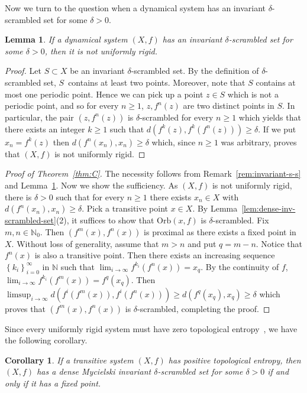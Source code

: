 \documentclass[reqno,a4paper,12pt]{amsart}
\newtheorem{lem}[thm]{Lemma}
\newtheorem{cor}[thm]{Corollary}
\theoremstyle{definition}
\numberwithin{equation}{section}
\begin{document}
Now we turn to the question when a dynamical system has an invariant $\delta$-scrambled set for some $\delta>0$.

\begin{lem}\label{lem:invariant-delta}
If a dynamical system $(X,f)$ has an invariant $\delta$-scrambled set for some $\delta>0$, then it is not uniformly rigid.
\end{lem}
\begin{proof}
Let $S\subset X$ be an invariant $\delta$-scrambled set. By the definition of $\delta$-scrambled set,
$S$~contains at least two points. Moreover, note that $S$ contains at most one periodic point. Hence we can pick up a point $z\in S$ which is not a periodic point,
and so for every $n\geq 1$, $z,f^n(z)$ are two distinct points in $S$. In particular, the pair
$(z,f^n(z))$ is $\delta$-scrambled for every $n\geq 1$ which yields that
there exists an integer $k\geq 1$ such that $d(f^k(z),f^k(f^n(z)))\geq \delta$.
If we put $x_n=f^k(z)$ then $d(f^n(x_n),x_n)\geq \delta$ which, since $n\geq 1$ was arbitrary, proves that $(X,f)$
is not uniformly rigid.
\end{proof}

\begin{proof}[Proof of Theorem~\ref{thm:C}]
The necessity follows from Remark~\ref{rem:invariant-s-s} and Lemma~\ref{lem:invariant-delta}.
Now we show the sufficiency.
As $(X,f)$ is not uniformly rigid, there is $\delta>0$ such that
for every $n\geq 1$ there exists $x_n\in X$ with $d(f^n(x_n),x_n)\geq \delta$.
Pick a transitive point $x\in X$. By Lemma~\ref{lem:dense-inv-scrambled-set}(2),
it suffices to show that ${\mbox{Orb}}(x,f)$ is $\delta$-scrambled.
Fix $m,n\in{\mathbb{N}}_0$. Then $(f^m(x),f^n(x))$ is proximal as there exists a fixed point in $X$.
Without loss of generality, assume that $m>n$ and put $q=m-n$.
Notice that $f^n(x)$ is also a transitive point. Then there exists an increasing sequence  ${\left\{{k_i}\right\}}_{i=0}^\infty$
in ${\mathbb{N}}$
such that $\lim_{i\to\infty}f^{k_i}(f^n(x))=x_q$.
By the continuity of $f$, $\lim_{i\to\infty}f^{k_i}(f^m(x))=f^q(x_q)$.
Then $\limsup_{i\to\infty} d(f^i(f^m(x)),f^i(f^n(x)))\geq d(f^q(x_q),x_q)\geq \delta$
which proves that $(f^m(x),f^n(x))$ is $\delta$-scrambled, completing the proof.
\end{proof}

Since every uniformly rigid system must have zero topological entropy~\cite{GM89},
we have the following corollary.

\begin{cor}
If a  transitive system $(X,f)$ has positive topological entropy, then
$(X,f)$ has a dense Mycielski invariant $\delta$-scrambled set for some $\delta>0$
if and only if it has a fixed point.
\end{cor}
\end{document}
